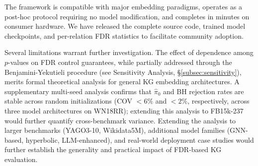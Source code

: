 The framework is compatible with major embedding paradigms, operates as a post-hoc protocol requiring no model modification, and completes in minutes on consumer hardware.
We have released the complete source code, trained model checkpoints, and per-relation FDR statistics to facilitate community adoption.

Several limitations warrant further investigation.
The effect of dependence among $p$-values on FDR control guarantees, while partially addressed through the Benjamini-Yekutieli procedure (see Sensitivity Analysis, \S\ref{subsec:sensitivity}), merits formal theoretical analysis for general KG embedding architectures.
A supplementary multi-seed analysis confirms that $\hat{\pi}_0$ and BH rejection rates are stable across random initializations (COV $< 6\%$ and $< 2\%$, respectively, across three model architectures on WN18RR); extending this analysis to FB15k-237 would further quantify cross-benchmark variance.
Extending the analysis to larger benchmarks (YAGO3-10, Wikidata5M), additional model families (GNN-based, hyperbolic, LLM-enhanced), and real-world deployment case studies would further establish the generality and practical impact of FDR-based KG evaluation.
